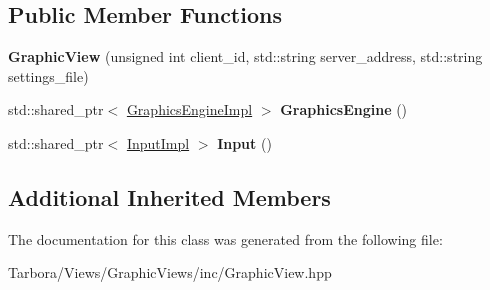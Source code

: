\subsection*{Public Member Functions}
\begin{DoxyCompactItemize}
\item 
\mbox{\label{classTarbora_1_1GraphicView_a86ff947cb5c9e3ec4a13b96752656188}} 
{\bfseries Graphic\+View} (unsigned int client\+\_\+id, std\+::string server\+\_\+address, std\+::string settings\+\_\+file)
\item 
\mbox{\label{classTarbora_1_1GraphicView_a748cb2836f51debebfac42537f8dfa1c}} 
std\+::shared\+\_\+ptr$<$ \hyperlink{classTarbora_1_1GraphicsEngineImpl}{Graphics\+Engine\+Impl} $>$ {\bfseries Graphics\+Engine} ()
\item 
\mbox{\label{classTarbora_1_1GraphicView_af1d9f86dc2a445634b42f2daf7ce5f72}} 
std\+::shared\+\_\+ptr$<$ \hyperlink{classTarbora_1_1InputImpl}{Input\+Impl} $>$ {\bfseries Input} ()
\end{DoxyCompactItemize}
\subsection*{Additional Inherited Members}


The documentation for this class was generated from the following file\+:\begin{DoxyCompactItemize}
\item 
Tarbora/\+Views/\+Graphic\+Views/inc/Graphic\+View.\+hpp\end{DoxyCompactItemize}
